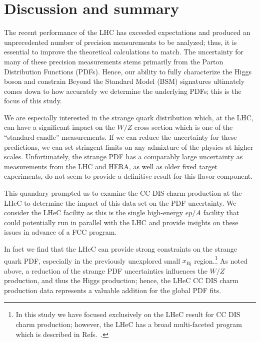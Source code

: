 \documentclass[pdftex,twocolumn,epjc3]{svjour3}          %
\newcommand{\xbj}{\ensuremath{x_{\text{Bj}}}\xspace}
\begin{document}
\section{Discussion and summary}
\label{sec:discuss}





The recent performance of the LHC has exceeded expectations and
produced an unprecedented number of precision measurements to be
analyzed; thus,  it is essential to improve the theoretical calculations to
match.
%
The uncertainty for many of these precision measurements stems
primarily from the Parton Distribution Functions (PDFs).
%
Hence, our ability to fully characterize the Higgs boson and constrain
Beyond the Standard Model (BSM) signatures ultimately comes down to
how accurately we determine the underlying PDFs; this is the focus of
this study.



We are especially interested in the strange quark distribution which,
at the LHC, can have a significant impact on the $W/Z$ cross section
which is one of the ``standard candle'' measurements.
%
If we can reduce the uncertainty for these predictions, we can set
stringent limits on any admixture of the physics at higher scales.
%
Unfortunately, the strange PDF has a comparably large uncertainty as
measurements from the LHC and HERA, as well as older fixed target experiments,
do not seem to provide a definitive result for this flavor component.

This quandary prompted us to examine the CC DIS charm production at the LHeC
to determine the impact of this data set on the PDF uncertainty.
%
We consider the LHeC facility as this is the single high-energy $ep/A$ facility that could potentially run
in parallel with the LHC and provide insights on these issues in advance of a FCC program. 

In fact we find that the LHeC can provide strong constraints on the strange quark PDF,
especially in the previously unexplored small \xbj region.\footnote{%
  In this study we have focused exclusively on the LHeC result for CC DIS charm production;
  however, the LHeC has a broad multi-faceted program which is described in Refs.~\cite{AbelleiraFernandez:2012ty,Klein:2018rhq}.
  }
%
As noted above, a reduction of the strange PDF uncertainties influences
the $W/Z$ production, and thus the Higgs production; hence, the
LHeC CC DIS charm production data  represents a valuable addition for the  global PDF fits.
%
\end{document}

